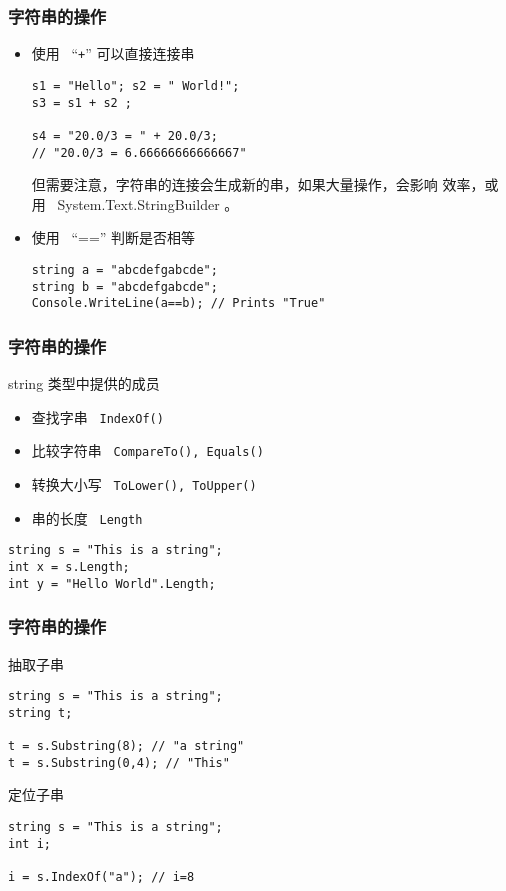 \begin{frame}[fragile]
\frametitle{字符串的操作}
\begin{itemize}
\item 使用 ~``\texttt{+}'' 可以直接连接串
\begin{lstlisting}
s1 = "Hello"; s2 = " World!";
s3 = s1 + s2 ;

s4 = "20.0/3 = " + 20.0/3;
// "20.0/3 = 6.66666666666667"
\end{lstlisting}

  \CJKindent \small 但需要注意，字符串的连接会生成新的串，如果大量操作，会影响
  效率，或用~ System.Text.StringBuilder 。
\pause
\item 使用 ~``=='' 判断是否相等
\begin{lstlisting}
string a = "abcdefgabcde";
string b = "abcdefgabcde";
Console.WriteLine(a==b); // Prints "True"
\end{lstlisting}
\end{itemize}
\end{frame}

\begin{frame}[fragile]
\frametitle{字符串的操作}
string 类型中提供的成员
\medskip
  \begin{itemize}
\setlength{\itemsep}{6pt plus 1pt}
  \item 查找字串~ \texttt{IndexOf()}
  \item 比较字符串~ \texttt{CompareTo(), Equals()}
  \item 转换大小写~ \texttt{ToLower(), ToUpper()}
  \item 串的长度~ \texttt{Length}
  \end{itemize}
\begin{lstlisting}
string s = "This is a string";
int x = s.Length;
int y = "Hello World".Length;
\end{lstlisting}
\end{frame}

\begin{frame}[fragile]
\frametitle{字符串的操作}
抽取子串
\begin{lstlisting}
string s = "This is a string";
string t;

t = s.Substring(8); // "a string"
t = s.Substring(0,4); // "This"
\end{lstlisting}

定位子串
\begin{lstlisting}
string s = "This is a string";
int i;

i = s.IndexOf("a"); // i=8
\end{lstlisting}
\end{frame}

